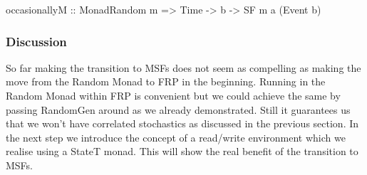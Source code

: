 \begin{HaskellCode}
occasionallyM :: MonadRandom m => Time -> b -> SF m a (Event b)
\end{HaskellCode}

\subsubsection{Discussion}
So far making the transition to MSFs does not seem as compelling as making the move from the Random Monad to FRP in the beginning. Running in the Random Monad within FRP is convenient but we could achieve the same by passing RandomGen around as we already demonstrated. Still it guarantees us that we won't have correlated stochastics as discussed in the previous section. In the next step we introduce the concept of a read/write environment which we realise using a StateT monad. This will show the real benefit of the transition to MSFs.